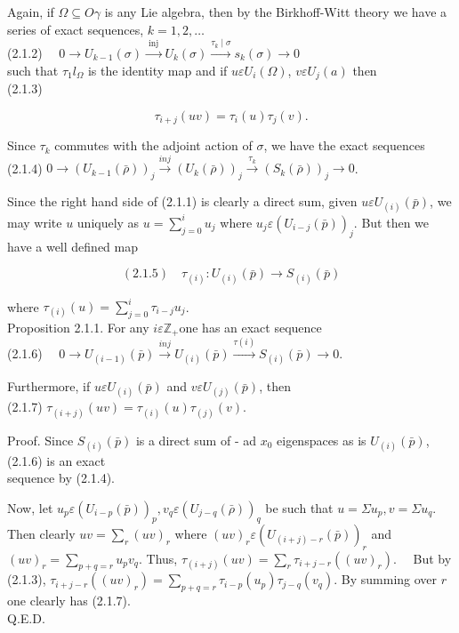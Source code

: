 \documentclass[10pt]{article}
\begin{document}
Again, if $\Omega \subseteq O \gamma$ is any Lie algebra, then by the Birkhoff-Witt theory we have a series of exact sequences, $k=1,2, \ldots$\\
(2.1.2) $\quad 0 \rightarrow U_{k-1}(\sigma) \xrightarrow{\text { inj }} U_{k}(\sigma) \xrightarrow{\tau_{k} \mid \sigma} s_{k}(\sigma) \rightarrow 0$\\
such that $\tau_{1} l_{\Omega}$ is the identity map and if $u \varepsilon U_{i}(\Omega)$, $v \varepsilon U_{j}(a)$ then\\
(2.1.3)

$$
\tau_{i+j}(u v)=\tau_{i}(u) \tau_{j}(v) .
$$

Since $\tau_{k}$ commutes with the adjoint action of $\sigma$, we have the exact sequences\\
(2.1.4) $0 \rightarrow\left(U_{k-1}(\bar{\rho})\right)_{j} \xrightarrow{i n j}\left(U_{k}(\bar{\rho})\right)_{j} \xrightarrow{\tau_{k}}\left(S_{k}(\bar{\rho})\right)_{j} \rightarrow 0$.

Since the right hand side of (2.1.1) is clearly a direct sum, given $u \varepsilon U_{(i)}(\bar{p})$, we may write $u$ uniquely as $u=\sum_{j=0}^{i} u_{j}$ where $u_{j} \varepsilon\left(U_{i-j}(\bar{p})\right)_{j}$. But then we have a well defined map

$$
(2.1 .5) \quad \tau_{(i)}: U_{(i)}(\bar{p}) \rightarrow S_{(i)}(\bar{p})
$$

where $\tau_{(i)}(u)=\sum_{j=0}^{i} \tau_{i-j} u_{j}$.\\
Proposition 2.1.1. For any $i \varepsilon \mathbb{Z}_{+}$one has an exact sequence\\
(2.1.6) $\quad 0 \rightarrow U_{(i-1)}(\bar{p}) \xrightarrow{i n j} U_{(i)}(\bar{p}) \xrightarrow{\tau(i)} S_{(i)}(\bar{p}) \rightarrow 0$.

Furthermore, if $u \varepsilon U_{(i)}(\bar{p})$ and $v \varepsilon U_{(j)}(\bar{p})$, then\\
(2.1.7) $\tau_{(i+j)}(u v)=\tau_{(i)}(u) \tau_{(j)}(v)$.

Proof. Since $S_{(i)}(\bar{p})$ is a direct sum of - ad $x_{0}$ eigenspaces as is $U_{(i)}(\bar{p})$, (2.1.6) is an exact\\
sequence by (2.1.4).

Now, let $u_{p} \varepsilon\left(U_{i-p}(\bar{p})\right)_{p}, v_{q} \varepsilon\left(U_{j-q}(\bar{\rho})\right)_{q}$ be such that $u=\Sigma u_{p}, v=\Sigma u_{q}$. Then clearly $u v=\sum_{r}(u v)_{r}$ where $(u v)_{r} \varepsilon\left(U_{(i+j)-r}(\bar{p})\right)_{r}$ and $(u v)_{r}=\sum_{p+q=r} u_{p} v_{q}$. Thus, $\tau_{(i+j)}(u v)=\sum_{r} \tau_{i+j-r}\left((u v)_{r}\right) . \quad$ But by (2.1.3), $\tau_{i+j-r}\left((u v)_{r}\right)=\sum_{p+q=r} \tau_{i-p}\left(u_{p}\right) \tau_{j-q}\left(v_{q}\right)$. By summing over $r$ one clearly has (2.1.7).\\
Q.E.D.
\end{document}

